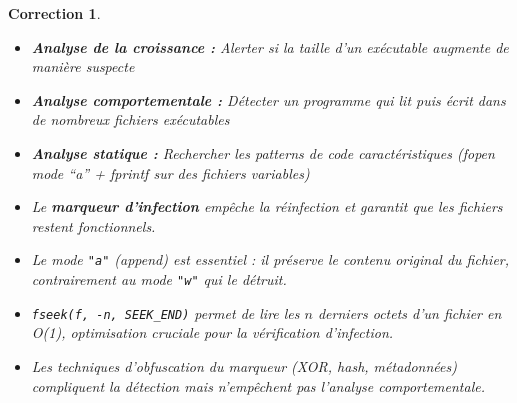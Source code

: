 \documentclass[a4paper,11pt]{article}
\theoremstyle{plain}
\newtheorem{correction}{Correction}
\theoremstyle{definition}
\begin{document}
\begin{correction}
\begin{enumerate}
\begin{itemize}
\item \textbf{Analyse de la croissance :} Alerter si la taille d'un exécutable augmente de manière suspecte

\item \textbf{Analyse comportementale :} Détecter un programme qui lit puis écrit dans de nombreux fichiers exécutables

\item \textbf{Analyse statique :} Rechercher les patterns de code caractéristiques (fopen mode ``a'' + fprintf sur des fichiers variables)
\end{itemize}

\end{enumerate}

\begin{pointcle}
\begin{itemize}
    \item Le \textbf{marqueur d'infection} empêche la réinfection et garantit que les fichiers restent fonctionnels.
    \item Le mode \texttt{"a"} (append) est essentiel : il préserve le contenu original du fichier, contrairement au mode \texttt{"w"} qui le détruit.
    \item \texttt{fseek(f, -n, SEEK\_END)} permet de lire les $n$ derniers octets d'un fichier en O(1), optimisation cruciale pour la vérification d'infection.
    \item Les techniques d'obfuscation du marqueur (XOR, hash, métadonnées) compliquent la détection mais n'empêchent pas l'analyse comportementale.
\end{itemize}
\end{pointcle}

\end{correction}
\end{document}
